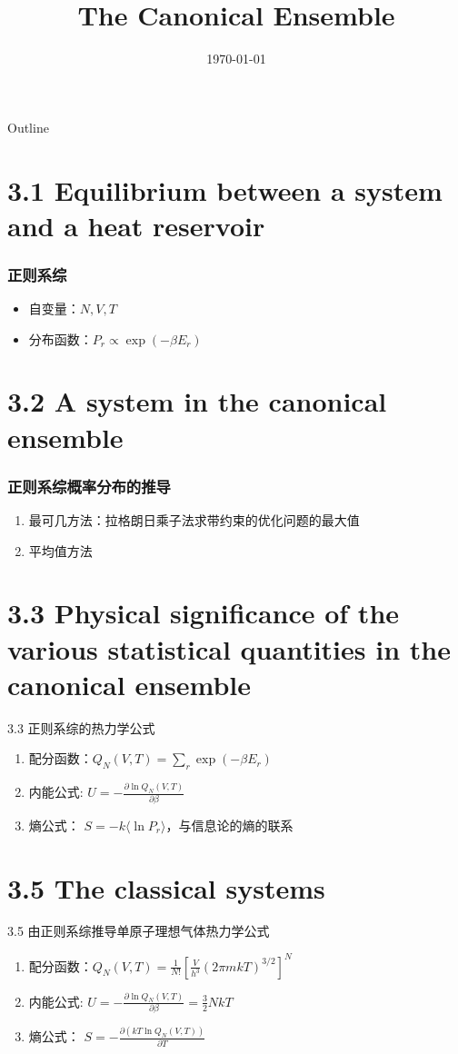 \documentclass{ctexbeamer}
\title{The Canonical Ensemble}
\date{\today}
\begin{document}
\begin{frame}
	\titlepage
\end{frame}
\begin{frame}{Outline}
    \tableofcontents
\end{frame}
\section{3.1 Equilibrium between 
a system and a heat reservoir
}

\begin{frame}
\frametitle{正则系综}
\begin{itemize}
    \item 自变量：$N,V,T$
    \item 分布函数：$P_r \propto \exp(-\beta E_r)$
\end{itemize}

\end{frame}
\section{3.2 A system in the canonical ensemble
}
\begin{frame}
    \frametitle{正则系综概率分布的推导}
    \begin{enumerate}
        \item 最可几方法：拉格朗日乘子法求带约束的优化问题的最大值
        \item 平均值方法
    \end{enumerate}
    
    \end{frame}
\section{3.3 Physical significance of the various statistical quantities in
the canonical ensemble}
\begin{frame}{3.3 正则系综的热力学公式}
    \begin{enumerate}
        \item 配分函数：$Q_N(V,T) = \sum_{r} \exp(- \beta E_r)$
        \item 内能公式: $U=-\frac{\partial \ln Q_N(V,T)}{\partial \beta}$
        \item 熵公式： $S=-k\langle \ln P_r \rangle$，与信息论的熵的联系
    \end{enumerate}
\end{frame}
\section{3.5 The classical systems}
\begin{frame}{3.5 由正则系综推导单原子理想气体热力学公式}
    \begin{enumerate}
        \item 配分函数：$Q_N(V,T) = \frac{1}{N!} \left[ \frac{V}{h^3}(2\pi mkT)^{3/2} \right]^N$
        \item 内能公式: $U=-\frac{\partial \ln Q_N(V,T)}{\partial \beta}=\frac{3}{2}NkT$
        \item 熵公式： $S=-\frac{ \partial (kT \ln Q_N(V,T))}
        { \partial T}$
    \end{enumerate}
\end{frame}
\end{document}
